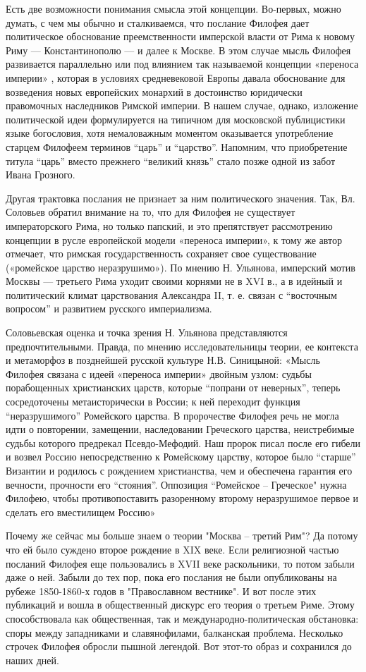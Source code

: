 \documentclass[a4paper, 12pt]{article}
\begin{document}
Есть две возможности понимания смысла этой концепции. Во-первых, можно думать, с чем мы обычно и сталкиваемся, что послание Филофея дает политическое обоснование преемственности имперской власти от Рима к новому Риму — Константинополю — и далее к Москве. В этом случае мысль Филофея развивается параллельно или под влиянием так называемой концепции «переноса империи» , которая в условиях средневековой Европы давала обоснование для возведения новых европейских монархий в достоинство юридически правомочных наследников Римской империи. В нашем случае, однако, изложение политической идеи формулируется на типичном для московской публицистики языке богословия, хотя немаловажным моментом оказывается употребление старцем Филофеем терминов “царь” и “царство”. Напомним, что приобретение титула “царь” вместо прежнего “великий князь” стало позже одной из забот Ивана Грозного.

Другая трактовка послания не признает за ним политического значения. Так, Вл. Соловьев обратил внимание на то, что для Филофея не существует императорского Рима, но только папский, и это препятствует рассмотрению концепции в русле европейской модели «переноса империи», к тому же автор отмечает, что римская государственность сохраняет свое существование («ромейское царство неразрушимо»). По мнению Н. Ульянова, имперский мотив Москвы — третьего Рима уходит своими корнями не в XVI в., а в идейный и политический климат царствования Александра II, т. е. связан с “восточным вопросом” и развитием русского империализма.

Соловьевская оценка и точка зрения Н. Ульянова представляются предпочтительными. Правда, по мнению исследовательницы теории, ее контекста и метаморфоз в позднейшей русской культуре Н.В. Синицыной: «Мысль Филофея связана с идеей «переноса империи» двойным узлом: судьбы порабощенных христианских царств, которые “попрани от неверных”, теперь сосредоточены метаисторически в России; к ней переходит функция “неразрушимого” Ромейского царства. В пророчестве Филофея речь не могла идти о повторении, замещении, наследовании Греческого царства, неистребимые судьбы которого предрекал Псевдо-Мефодий. Наш пророк писал после его гибели и возвел Россию непосредственно к Ромейскому царству, которое было “старше” Византии и родилось с рождением христианства, чем и обеспечена гарантия его вечности, прочности его “стояния”. Оппозиция “Ромейское – Греческое" нужна Филофею, чтобы противопоставить разоренному второму неразрушимое первое и сделать его вместилищем Россию»

Почему же сейчас мы больше знаем о теории "Москва -- третий Рим"? Да потому что ей было суждено второе рождение в XIX веке. Если религиозной частью посланий Филофея еще пользовались в XVII веке раскольники, то потом забыли даже о ней. Забыли до тех пор, пока его послания не были опубликованы на рубеже 1850-1860-х годов в "Православном вестнике". И вот после этих публикаций и вошла в общественный дискурс его теория о третьем Риме. Этому способствовала как общественная, так и международно-политическая обстановка: споры между западниками и славянофилами, балканская проблема. Несколько строчек Филофея обросли пышной легендой. Вот этот-то образ и сохранился до наших дней.
\end{document}
